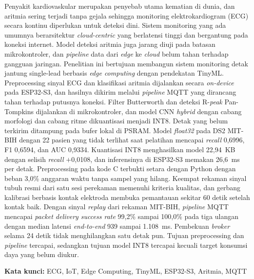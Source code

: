 Penyakit kardiovaskular merupakan penyebab utama kematian di dunia, dan aritmia sering terjadi tanpa gejala sehingga monitoring elektrokardiogram (ECG) secara kontinu diperlukan untuk deteksi dini. Sistem monitoring yang ada umumnya berarsitektur \textit{cloud-centric} yang berlatensi tinggi dan bergantung pada koneksi internet. Model deteksi aritmia juga jarang diuji pada batasan mikrokontroler, dan \textit{pipeline} data dari \textit{edge} ke \textit{cloud} belum tahan terhadap gangguan jaringan. Penelitian ini bertujuan membangun sistem monitoring detak jantung single-lead berbasis \textit{edge computing} dengan pendekatan TinyML. Preprocessing sinyal ECG dan klasifikasi aritmia dijalankan secara \textit{on-device} pada ESP32-S3, dan hasilnya dikirim melalui \textit{pipeline} MQTT yang dirancang tahan terhadap putusnya koneksi. Filter Butterworth dan deteksi R-\textit{peak} Pan-Tompkins dijalankan di mikrokontroler, dan model CNN \textit{hybrid} dengan cabang morfologi dan cabang ritme dikuantisasi menjadi INT8. Detak yang belum terkirim ditampung pada bufer lokal di PSRAM. Model \textit{float32} pada DS2 MIT-BIH dengan 22 pasien yang tidak terlihat saat pelatihan mencapai \textit{recall} 0,6996, F1 0,6594, dan AUC 0,9334. Kuantisasi INT8 menghasilkan model 22,94~KB dengan selisih \textit{recall} $+$0,0108, dan inferensinya di ESP32-S3 memakan 26,6~ms per detak. Preprocessing pada kode C terbukti setara dengan Python dengan beban 3,0\% anggaran waktu tanpa sampel yang hilang. Keempat rekaman sinyal tubuh resmi dari satu sesi perekaman memenuhi kriteria kualitas, dan gerbang kalibrasi berbasis kontak elektroda membuka pemantauan sekitar 60 detik setelah kontak baik. Dengan sinyal \textit{replay} dari rekaman MIT-BIH, \textit{pipeline} MQTT mencapai \textit{packet delivery success rate} 99,2\% sampai 100,0\% pada tiga ulangan dengan median latensi \textit{end-to-end} 939 sampai 1.108~ms. Pembekuan \textit{broker} selama 24 detik tidak menghilangkan satu detak pun. Tujuan preprocessing dan \textit{pipeline} tercapai, sedangkan tujuan model INT8 tercapai kecuali target konsumsi daya yang belum diukur.

\vspace{0.25cm}
\noindent
\textbf{Kata kunci:} ECG, IoT, Edge Computing, TinyML, ESP32-S3, Aritmia, MQTT

\clearpage
